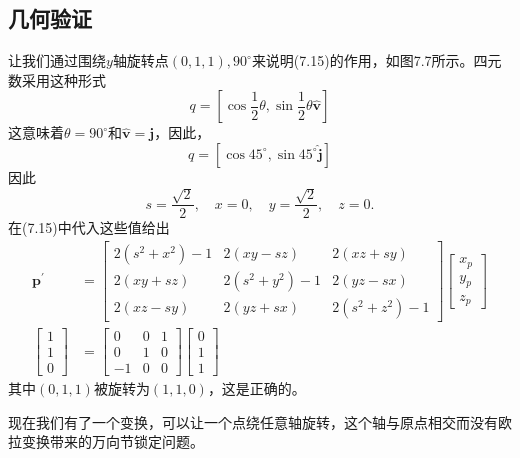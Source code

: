 \subsection{几何验证}
让我们通过围绕$y$轴旋转点$(0,1,1), 90^{\circ}$来说明(7.15)的作用，如图7.7所示。四元数采用这种形式
$$
q=\left[\cos \frac{1}{2} \theta, \sin \frac{1}{2} \theta \hat{\mathbf{v}}\right]
$$
这意味着$\theta=90^{\circ}$和$\hat{\mathbf{v}}=\mathbf{j}$，因此，
$$
q=\left[\cos 45^{\circ}, \sin 45^{\circ} \hat{\mathbf{j}}\right]
$$
因此
$$
s=\frac{\sqrt{2}}{2}, \quad x=0, \quad y=\frac{\sqrt{2}}{2}, \quad z=0 .
$$
在(7.15)中代入这些值给出
$$
\begin{aligned}
\mathbf{p}^{\prime} & =\left[\begin{array}{ccc}
2\left(s^{2}+x^{2}\right)-1 & 2(x y-s z) & 2(x z+s y) \\
2(x y+s z) & 2\left(s^{2}+y^{2}\right)-1 & 2(y z-s x) \\
2(x z-s y) & 2(y z+s x) & 2\left(s^{2}+z^{2}\right)-1
\end{array}\right]\left[\begin{array}{l}
x_{p} \\
y_{p} \\
z_{p}
\end{array}\right] \\
{\left[\begin{array}{l}
1 \\
1 \\
0
\end{array}\right] } & =\left[\begin{array}{ccc}
0 & 0 & 1 \\
0 & 1 & 0 \\
-1 & 0 & 0
\end{array}\right]\left[\begin{array}{l}
0 \\
1 \\
1
\end{array}\right]
\end{aligned}
$$
其中$(0,1,1)$被旋转为$(1,1,0)$，这是正确的。

现在我们有了一个变换，可以让一个点绕任意轴旋转，这个轴与原点相交而没有欧拉变换带来的万向节锁定问题。

